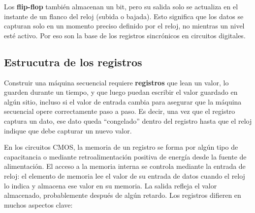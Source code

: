 Los \textbf{flip-flop} también almacenan un bit, pero su salida solo se actualiza en el instante de un flanco del reloj (subida o bajada). Esto significa que los datos se capturan solo en un momento preciso definido por el reloj, no mientras un nivel esté activo. Por eso son la base de los registros sincrónicos en circuitos digitales.

\subsection{Estrucutra de los registros}

Construir una máquina secuencial requiere \textbf{registros} que lean un valor, lo guarden durante un tiempo, y que luego puedan escribir  el valor guardado en algún sitio, incluso si el valor de entrada cambia  para asegurar que la máquina secuencial opere correctamente paso a paso. Es decir, una vez que el registro captura un dato, ese dato queda “congelado” dentro del registro hasta que el reloj indique que debe capturar un nuevo valor. 


En los circuitos CMOS, la memoria de un registro se forma por algún tipo de capacitancia o mediante retroalimentación positiva de energía desde la fuente de alimentación. El acceso a la memoria interna se controla mediante la entrada de reloj: el elemento de memoria lee el valor de su entrada de datos cuando el reloj lo indica y almacena ese valor en su memoria. La salida refleja el valor almacenado, probablemente después de algún retardo. Los registros difieren en muchos aspectos clave:

